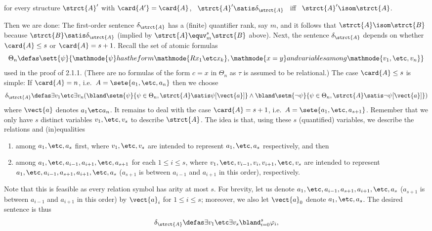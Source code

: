 \begin{enumerate}[1.]
\begin{enumerate}[(a)]
\begin{center}
for every structure $\strct{A}'$ with $\card{A'} = \card{A}$, \ $\strct{A}' \satis \delta_\strct{A}$ \ iff \ $\strct{A}' \isom \strct{A}$.
\end{center}
Then we are done: The first-order sentence $\delta_\strct{A}$ has a (finite) quantifier rank, say $m$, and it follows that $\strct{A} \isom \strct{B}$ because $\strct{B} \satis \delta_\strct{A}$ (implied by $\strct{A} \equv^s_m \strct{B}$ above).
\newpar
Next, the sentence $\delta_\strct{A}$ depends on whether $\card{A} \leq s$ or $\card{A} = s + 1$. Recall the set of atomic formulas
\[
\Theta_n \defas \sett{\psi}{\mathmode{\psi} has the form \mathmode{Rx_1 \etc x_k}, \mathmode{x = y} and variables among \mathmode{v_1, \etc, v_n}}
\]
used in the proof of 2.1.1. (There are no formulas of the form $c = x$ in $\Theta_n$ as $\tau$ is assumed to be relational.)
\newpar
The case $\card{A} \leq s$ is simple: If $\card{A} = n$, i.e.\ $A = \sete{a_1, \etc, a_n}$ then we choose
\[
\delta_\strct{A} \defas \exists v_1 \etc \exists v_n (\bland\setm{\psi}{\psi \in \Theta_n, \strct{A} \satis \psi[\vect{a}]} \land \bland\setm{\neg\psi}{\psi \in \Theta_n, \strct{A} \satis \neg\psi[\vect{a}]})
\]
where $\vect{a}$ denotes $a_1 \etc a_n$.
\newpar
It remains to deal with the case $\card{A} = s + 1$, i.e.\ $A = \sete{a_1, \etc, a_{s + 1}}$. Remember that we only have $s$ distinct variables $v_1, \etc, v_s$ to describe $\strct{A}$. The idea is that, using these $s$ (quantified) variables, we describe the relations and (in)equalities
\begin{enumerate}[(1)]
\item among $a_1, \etc, a_s$ first, where $v_1, \etc, v_s$ are intended to represent $a_1, \etc, a_s$ respectively, and then
\item among $a_1, \etc, a_{i - 1}, a_{i + 1}, \etc, a_{s + 1}$ for each $1 \leq i \leq s$, where $v_1, \etc, v_{i - 1}, v_i, v_{i + 1}, \etc, v_s$ are intended to represent $a_1, \etc, a_{i - 1}, a_{s + 1}, a_{i + 1}, \etc, a_s$ ($a_{s + 1}$ is between $a_{i - 1}$ and $a_{i + 1}$ in this order), respectively.
\end{enumerate}
Note that this is feasible as every relation symbol has arity at most $s$.
\newpar
For brevity, let us denote $a_1, \etc, a_{i - 1}, a_{s + 1}, a_{i + 1}, \etc, a_s$ ($a_{s + 1}$ is between $a_{i - 1}$ and $a_{i + 1}$ in this order) by $\vect{a}_i$ for $1 \leq i \leq s$; moreover, we also let $\vect{a}_0$ denote $a_1, \etc, a_s$. The desired sentence is thus
\[
\delta_\strct{A} \defas \exists v_1 \etc \exists v_s \bland^s_{i = 0} \varphi_i,
\]
\end{enumerate}
\end{enumerate}
